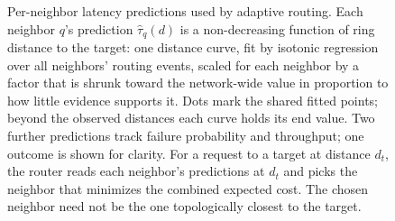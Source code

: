 \begin{figure}[t]
\caption{Per-neighbor latency predictions used by adaptive routing.
Each neighbor $q$'s prediction $\widehat{\tau}_q(d)$ is a non-decreasing
function of ring distance to the target: one distance curve, fit by isotonic
regression over all neighbors' routing events, scaled
for each neighbor by a factor that is shrunk toward the network-wide value in
proportion to how little evidence supports it. Dots mark the shared fitted
points; beyond the observed distances each curve holds its end value. Two
further predictions track failure probability and throughput; one outcome is
shown for clarity. For a request to a target at distance $d_t$, the router
reads each neighbor's predictions at $d_t$ and picks the neighbor that
minimizes the combined expected cost. The chosen neighbor need not be the one
topologically closest to the target.}
\label{fig:adaptive-routing}
\end{figure}
